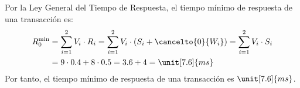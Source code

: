 \begin{ejercicio}
\begin{enumerate}
        Por la Ley General del Tiempo de Respuesta, el tiempo mínimo de respuesta de una transacción es:
        \begin{align*}
            R_0^{\text{min}} &= \sum_{i=1}^{2} V_i \cdot R_i =\sum_{i=1}^{2} V_i \cdot (S_i + \cancelto{0}{W_ i})
            = \sum_{i=1}^{2} V_i \cdot S_i \\
            &= 9 \cdot 0.4 + 8 \cdot 0.5 = 3.6 + 4 = \unit[7.6]{ms}
        \end{align*}
        Por tanto, el tiempo mínimo de respuesta de una transacción es $\unit[7.6]{ms}$.
    \end{enumerate}
\end{ejercicio}
\begin{comment}
\solucion
    \begin{enumerate}
        \item El cuello de botella del sistema es el disco.
        \item La utilización del cuello de botella es 0.6.
        \item La productividad máxima del sistema es 0.25 transacciones/ms.
        \item El tiempo mínimo de respuesta de una transacción es 7.6 ms.
    \end{enumerate}
\end{comment}

